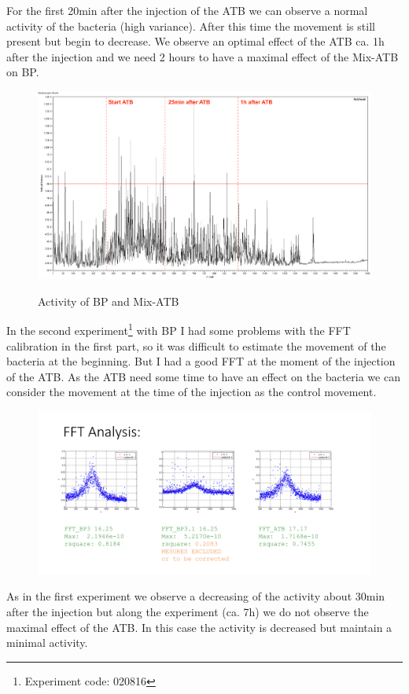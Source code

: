 \documentclass[11pt, a4paper]{article}
\begin{document}
For the first 20min after the injection of the ATB we can observe a normal activity of the bacteria (high variance). After this time the movement is still present but begin to decrease. We observe an optimal effect of the ATB ca. 1h after the injection and we need 2 hours to have a maximal effect of the Mix-ATB on BP. 
\begin{figure}[h]
\centering
\includegraphics[width=1\linewidth]{Signal/sig280716.jpg}
\label{fig:Exp 280716}
\caption{Activity of BP and Mix-ATB}
\end{figure}

In the second  experiment\footnote{Experiment code: 020816} with BP  I had some problems with the FFT calibration in the first part, so it was difficult to estimate the movement  of the bacteria at the beginning. But I had a good FFT at the moment of the injection of the ATB. As the ATB need some time to have an effect on the bacteria we can consider the  movement at the time of the injection as the control movement. 
\begin{figure}
\centering
\includegraphics[width=0.7\linewidth]{FFT/FFT_020816.png}
\end{figure}
As in the first experiment we observe a decreasing of the activity about 30min after the injection but along the experiment (ca. 7h) we do not observe the maximal effect of the ATB. In this case the activity is decreased but maintain a minimal activity. 
\end{document}
